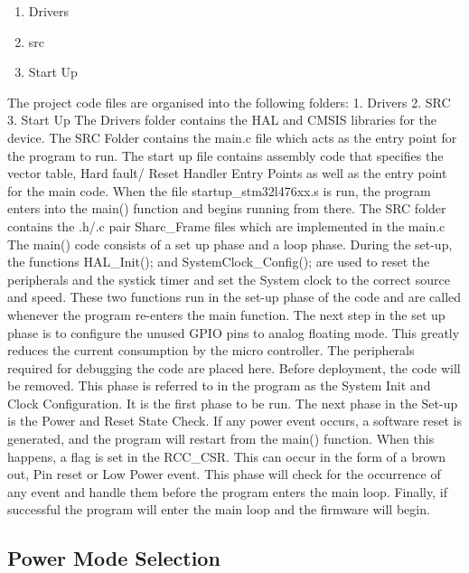 \begin{enumerate}
    \item Drivers
    \item src
    \item Start Up
\end{enumerate}
The project code files are organised into the following folders:
1.	Drivers 
2.	SRC
3.	Start Up
The Drivers folder contains the HAL and CMSIS libraries for the device.  The SRC Folder contains the main.c file which acts as the entry point for the program to run. The start up file contains assembly code that specifies the vector table, Hard fault/ Reset Handler Entry Points as well as the entry point for the main code. When the file startup\_stm32l476xx.s is run, the program enters into the main() function and begins running from there. The SRC folder contains the .h/.c pair Sharc\_Frame files which are implemented in the main.c 
The main() code consists of a set up phase and a loop phase. During the set-up, the functions HAL\_Init(); and SystemClock\_Config(); are used to reset the peripherals and the systick timer and set the System clock to the correct source and speed. These two functions run in the set-up phase of the code and are called whenever the program re-enters the main function. The next step in the set up phase is to configure the unused GPIO pins to analog floating mode. This greatly reduces the current consumption by the micro controller. The peripherals required for debugging the code are placed here. Before deployment, the code will be removed. This phase is referred to in the program as the System Init and Clock Configuration. It is the first phase to be run.
The next phase in the Set-up is the Power and Reset State Check. If any power event occurs, a software reset is generated, and the program will restart from the main() function. When this happens, a flag is set in the RCC\_CSR. This can occur in the form of a brown out, Pin reset or Low Power event. This phase will check for the occurrence of any event and handle them before the program enters the main loop. Finally, if successful the program will enter the main loop and the firmware will begin.  

\subsection{Power Mode Selection}

